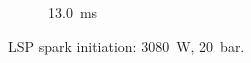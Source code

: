 \begin{figure}[h]
\begin{subfigure}[t]{0.3\textwidth}
        \caption{\qty{13.0}{ms}}
    \end{subfigure}
    \caption{LSP spark initiation: \qty{3080}{W}, \qty{20}{bar}. }
    \label{fig:V1_spark_initiation_frames}
\end{figure}